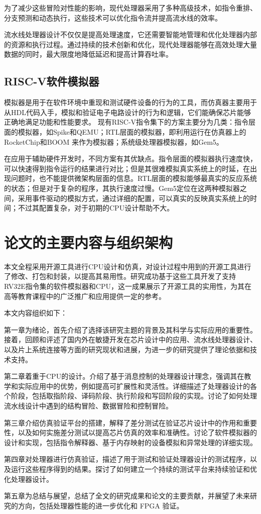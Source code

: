 为了减少这些冒险对性能的影响，现代处理器采用了多种高级技术，如指令重排、分支预测和动态执行，这些技术可以优化指令流并提高流水线的效率。

流水线处理器设计不仅仅是提高处理速度，它还需要智能地管理和优化处理器内部的资源和执行过程。通过持续的技术创新和优化，现代处理器能够在高效处理大量数据的同时，最大限度地降低延迟和提高计算吞吐率。

\subsection{RISC-V软件模拟器}

模拟器是用于在软件环境中重现和测试硬件设备的行为的工具，而仿真器主要用于从HDL代码入手，模拟和验证电子电路设计的行为和逻辑，它们能确保芯片能够正确地满足功能和性能要求。
现有RISC-V指令集下的方案主要分为几类：指令层面的模拟器，如Spike\cite{RiscvsoftwaresrcRiscvisasim2023}和QEMU\cite{bellardQEMUFastPortable2005}；RTL层面的模拟器，即利用运行在仿真器上的RocketChip\cite{ChipsallianceRocketchip2023}和BOOM\cite{zhaoSonicBOOM3rdGeneration} 来作为模拟器；系统级处理器模拟器，如Gem5\cite{lowe-powerGem5SimulatorVersion2020,roelkeRISC5ImplementingRISCV2017}。

在应用于辅助硬件开发时，不同方案有其优缺点。指令层面的模拟器执行速度快，可以快速得到指令运行的结果进行对比；但是其很难模拟真实系统上的时延，在出现问题时，也不能提供微架构层面的信息。RTL层面的模拟能够最真实的反应系统的状态；但是对于复杂的程序，其执行速度过慢。Gem5定位在这两种模拟器之间，采用事件驱动的模拟方式，通过详细的配置，可以真实的反映真实系统上的时间；不过其配置复杂，对于初期的CPU设计帮助不大。

\section{论文的主要内容与组织架构}

本文全程采用开源工具进行CPU设计和仿真，对设计过程中用到的开源工具进行了修改、打包和封装，以提高其易用性。研究成功基于这些工具开发了支持RV32E指令集的软件模拟器和CPU，这一成果展示了开源工具的实用性，为其在高等教育课程中的广泛推广和应用提供一定的参考。

本文内容组织如下：

第一章为绪论，首先介绍了选择该研究主题的背景及其科学与实际应用的重要性。接着，回顾和评述了国内外在敏捷开发在芯片设计中的应用、流水线处理器设计、以及片上系统连接等方面的研究现状和进展，为进一步的研究提供了理论依据和技术支持。

第二章着重于CPU的设计。介绍了基于消息控制的处理器设计理念，强调其在教学和实际应用中的优势，例如提高可扩展性和灵活性。详细描述了处理器设计的各个阶段，包括取指阶段、译码阶段、执行阶段和写回阶段的实现。讨论了如何处理流水线设计中遇到的结构冒险、数据冒险和控制冒险。

第三章介绍仿真验证平台的搭建，解释了差分测试在验证芯片设计中的作用和重要性，以及如何实施差分测试以提高芯片仿真的效率和准确性。讨论了软件模拟器的设计和实现，包括指令解释器、基于内存映射的设备模拟和异常处理的详细实现。

第四章对处理器进行仿真验证，描述了用于测试和验证处理器设计的测试程序，以及运行这些程序得到的结果。探讨了如何建立一个持续的测试平台来持续验证和优化处理器设计。

第五章为总结与展望，总结了全文的研究成果和论文的主要贡献，并展望了未来研究的方向，包括处理器性能的进一步优化和 FPGA 验证。



